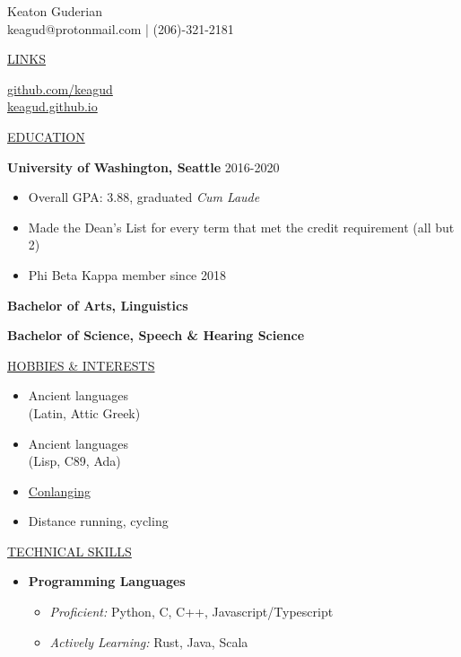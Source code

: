 \documentclass[11pt]{article}
\newcommand{\resumetitle}[3]{
    \AddToShipoutPictureBG{
        \AtPageUpperLeft {
        \raisebox{-0.09\paperheight}{
            \color{black!85}\rule{2\paperwidth}{\paperheight}}
        }}
    \begin{Center}
        \begingroup
        \titlethin
        \color{black!10}\Huge{#1}
        \titlethick
        \color{black!5}\Huge{#2} \\
        \vspace{2mm}
        \textrm{\color{black!15}\Large{#3}}
        \endgroup
    \end{Center}
    \vspace{7mm}
}
\newcommand{\betteruline}[1]{
    \uline{#1}
}
\newcommand{\sectiontitle}[1]{
    \begingroup
        \titlebold
        \betteruline{\Large\uppercase{#1}  }
        \vspace{1.7mm}
    \endgroup
}
\newcommand{\sectioncontent}[1]{
    \begingroup
        \begin{FlushLeft}
        \vspace{-3mm}
        \sffamily\small#1
        \end{FlushLeft}
    \endgroup
    \vspace{2mm}
}
\begin{document}
    \resumetitle{Keaton}{Guderian} {
      keagud@protonmail.com | (206)-321-2181
    }

    \setlength{\columnsep}{7mm}
    \begin{paracol}{2}

    \sectiontitle{links}
    \sectioncontent{
        \hspace{2mm}
        \href{https://github.com/keagud}{github.com/keagud} \\
        \faIcon{link}\hspace{1.8mm}
        \href{keagud.github.io}{keagud.github.io}
    }

    \sectiontitle{education}
    \sectioncontent{
        \begingroup
      \textbf{University of Washington, Seattle }\hfill\color{black!70}\small{2016-2020}
        \endgroup
      \begin{itemize}
      \item Overall GPA: 3.88, graduated \textit{Cum Laude}
      \item Made the Dean's List for every term that met the credit requirement (all but 2)
      \item Phi Beta Kappa member since 2018
        \end{itemize}
      \item \textbf{Bachelor of Arts, Linguistics }
             \item \textbf{Bachelor of Science, Speech \& Hearing Science}
      } 

    \sectiontitle{Hobbies \& Interests}
    \sectioncontent{
      \begin{itemize}
        \item Ancient languages \\ (Latin, Attic Greek)
        \item Ancient languages \\  (Lisp, C89, Ada)
        \item \href{https://en.wikipedia.org/wiki/Constructed\_language}{Conlanging}
        \item Distance running, cycling

      \end{itemize}
    }

    \switchcolumn
    

    \sectiontitle{Technical Skills}
    \sectioncontent{
      \begin{itemize}
        \item \textbf{Programming Languages}
          \begin{itemize}
            \item \textit{Proficient:} Python, C, C++, Javascript/Typescript
            \item \textit{Actively Learning:} Rust, Java, Scala
          \end{itemize}


\end{itemize}}
\end{paracol}
\end{document}
